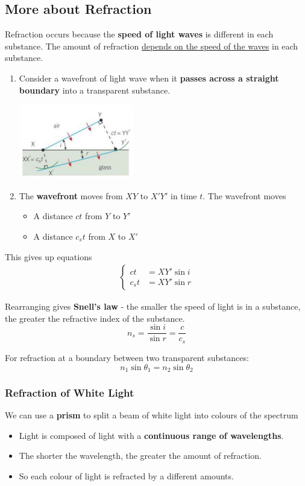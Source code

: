 \subsection{More about Refraction}

Refraction occurs because the \textbf{speed of light waves} is different in each substance. The amount of refraction \underline{depends on the speed of the waves} in each substance.

\begin{enumerate}
    \item Consider a wavefront of light wave when it \textbf{passes across a straight boundary} into a transparent substance.
        \begin{center}
            \includegraphics[width=5cm]{img/refraction}
        \end{center}
    \item The \textbf{wavefront} moves from $XY$ to $X'Y'$ in time $t$. The wavefront moves
        \begin{itemize}
            \item A distance $ct$ from $Y$ to $Y'$
            \item A distance $c_st$ from $X$ to $X'$
        \end{itemize}
\end{enumerate}
This gives up equations
\begin{align*}
    \begin{cases}
        ct&=XY'\sin i\\
        c_st&=XY'\sin r
    \end{cases}
\end{align*}

Rearranging gives \textbf{Snell's law} - the smaller the speed of light is in a substance, the greater the refractive index of the substance.
$$n_s=\frac{\sin i}{\sin r}=\frac{c}{c_s}$$

For refraction at a boundary between two transparent substances:
$$n_1\sin\theta_1=n_2\sin\theta_2$$

\subsubsection*{Refraction of White Light}
We can use a \textbf{prism} to split a beam of white light into colours of the spectrum
\begin{itemize}
    \item Light is composed of light with a \textbf{continuous range of wavelengths}.
    \item The shorter the wavelength, the greater the amount of refraction.
    \item So each colour of light is refracted by a different amounts.
\end{itemize}
